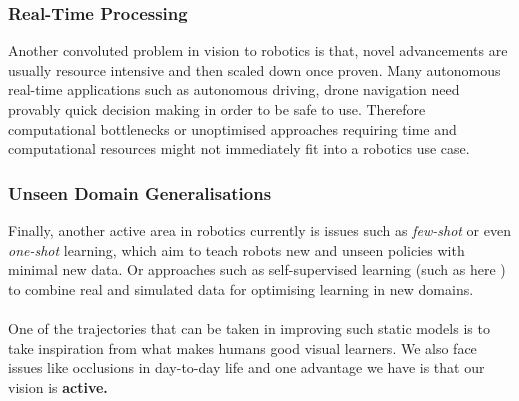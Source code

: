     \subsubsection{Real-Time Processing}
    Another convoluted problem in vision to robotics is that, novel advancements are usually resource intensive and then scaled down once proven. Many autonomous real-time  applications such as autonomous driving, drone navigation need provably quick decision making in order to be safe to use. Therefore computational bottlenecks or unoptimised approaches requiring time and computational resources might not immediately fit into a robotics use case.

    \subsubsection{Unseen Domain Generalisations}
    Finally, another active area in robotics currently is issues such as \emph{few-shot} or even \emph{one-shot} learning, which aim to teach robots new and unseen policies with minimal new data. Or approaches such as self-supervised learning (such as here \cite{lim2022real2sim2real, huang2021robot}) to combine real and simulated data for optimising learning in new domains.
    \\\\
    One of the trajectories that can be taken in improving such static models is to take inspiration from what makes humans good visual learners. We also face issues like occlusions in day-to-day life and one advantage we have is that our vision is \textbf{active.}
    
  

    